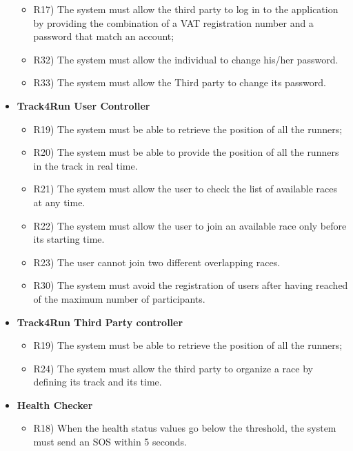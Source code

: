 \begin{itemize}
\begin{itemize}
			\item R17) The system must allow the third party to log in to the application by providing the combination of a VAT registration number and a password that match an account;\\
			\item R32) The system must allow the individual to change his/her password.\\
			\item R33) The system must allow the Third party to change its password.\\
		\end{itemize}
		\item \textbf{Track4Run User Controller}
		\begin{itemize}
			\item R19) The system must be able to retrieve the position of all the runners;\\
			\item R20) The system must be able to provide the position of all the runners in the track in real time.\\
			\item R21) The system must allow the user to check the list of available races at any time.\\
			\item R22) The system must allow the user to join an available race only before its starting time.\\
			\item R23) The user cannot join two different overlapping races.\\
			\item R30) The system must avoid the registration of users after having reached of the maximum number of participants.\\
		\end{itemize}
		\item \textbf{Track4Run Third Party controller}
		\begin{itemize}
			\item R19) The system must be able to retrieve the position of all the runners;\\
			\item R24) The system must allow the third party to organize a race by defining its track and its time.\\
		\end{itemize}
		\item \textbf{Health Checker}
		\begin{itemize}
			\item R18) When the health status values go below the threshold, the system must send an SOS within 5 seconds.\\

\end{itemize}
\end{itemize}
